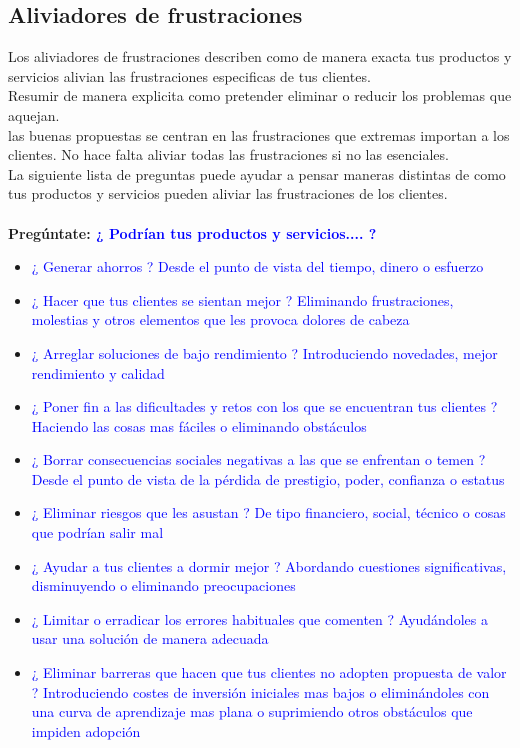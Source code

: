 \documentclass[11pt]{book}
\begin{document}
\subsection{Aliviadores de frustraciones}
Los aliviadores de frustraciones describen como de manera exacta tus productos y servicios alivian las frustraciones especificas de tus clientes.\\
Resumir de manera explicita como pretender eliminar o reducir los problemas que aquejan.\\
las buenas propuestas se centran en las frustraciones que extremas importan a los clientes. No hace falta aliviar todas las frustraciones si no las esenciales.\\
La siguiente lista de preguntas puede ayudar a pensar maneras distintas de como tus productos y servicios pueden aliviar las frustraciones de los clientes.\\\\
\textbf{Pregúntate: \textcolor{blue}{¿ Podrían tus productos y servicios.... ?}}
\begin{itemize}
\item \textcolor{blue}{¿ Generar ahorros ? Desde el punto de vista del tiempo, dinero o esfuerzo}
\item \textcolor{blue}{¿ Hacer que tus clientes se sientan mejor ? Eliminando frustraciones, molestias y otros elementos que les provoca dolores de cabeza}
\item \textcolor{blue}{¿ Arreglar soluciones de bajo rendimiento ? Introduciendo novedades, mejor rendimiento y calidad}
\item \textcolor{blue}{¿ Poner fin a las dificultades y retos con los que se encuentran tus clientes ? Haciendo las cosas mas fáciles o eliminando obstáculos}
\item \textcolor{blue}{¿ Borrar consecuencias sociales negativas a las que se enfrentan o temen ? Desde el punto de vista de la pérdida de prestigio, poder, confianza o estatus}
\item \textcolor{blue}{¿ Eliminar riesgos que les asustan ? De tipo financiero, social, técnico o cosas que podrían salir mal}
\item \textcolor{blue}{¿ Ayudar a tus clientes a dormir mejor ? Abordando cuestiones significativas, disminuyendo o eliminando preocupaciones}
\item \textcolor{blue}{¿ Limitar o erradicar los errores habituales que comenten ? Ayudándoles a usar una solución de manera adecuada}
\item \textcolor{blue}{¿ Eliminar barreras que hacen que tus clientes no adopten propuesta de valor ? Introduciendo costes de inversión iniciales mas bajos o eliminándoles con una curva de aprendizaje mas plana o suprimiendo otros obstáculos que impiden adopción}
\end{itemize}
\end{document}

